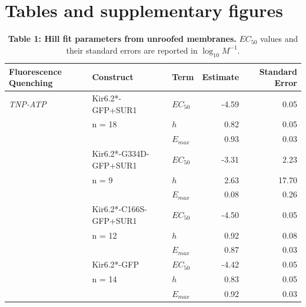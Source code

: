 \documentclass[9pt,lineno, onehalfspacing]{elife_modified}
\begin{document}
\section{Tables and supplementary figures}
\begin{table}
\centering\begingroup
\begin{tabular}{l l l r r}
\toprule
\textbf{Fluorescence Quenching} & Construct & Term & Estimate & Standard Error\\
\midrule
\textit{TNP-ATP} & Kir6.2*-GFP+SUR1       & $EC_{50}$ & -4.59 & 0.05\\
                 & n = 18                 & $h$       & 0.82  & 0.05\\
                 &                        & $E_{max}$ & 0.93  & 0.03\\
\cmidrule{2-5}
                 & Kir6.2*-G334D-GFP+SUR1 & $EC_{50}$ & -3.31 & 2.23\\
                 & n = 9                  & $h$       & 2.63  & 17.70\\
                 &                        & $E_{max}$ & 0.08  & 0.26\\
\cmidrule{2-5}
                 & Kir6.2*-C166S-GFP+SUR1 & $EC_{50}$ & -4.50 & 0.05\\
                 & n = 12                 & $h$       & 0.92  & 0.08\\
                 &                        & $E_{max}$ & 0.87  & 0.03\\
\cmidrule{2-5}
                 & Kir6.2*-GFP           & $EC_{50}$ & -4.42 & 0.05\\
                 & n = 14                & $h$       & 0.83  & 0.05\\
                 &                       & $E_{max}$ & 0.92  & 0.03\\
\midrule
\end{tabular}
\caption{\label{table:um} \textbf{Table 1: Hill fit parameters from unroofed membranes.} $EC_{50}$ values and their standard errors are reported in $\log_{10}M^{-1}$.}
\endgroup{}
\end{table}
\end{document}
